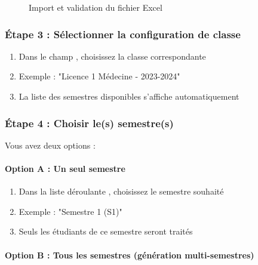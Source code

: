 \begin{figure}[h]
    \centering
    \caption{Import et validation du fichier Excel}
\end{figure}

\subsubsection{Étape 3 : Sélectionner la configuration de classe}

\begin{enumerate}[leftmargin=*]
    \item Dans le champ , choisissez la classe correspondante
    \item Exemple : "Licence 1 Médecine - 2023-2024"
    \item La liste des semestres disponibles s'affiche automatiquement
\end{enumerate}


\subsubsection{Étape 4 : Choisir le(s) semestre(s)}

Vous avez deux options :

\paragraph{Option A : Un seul semestre}

\begin{enumerate}[leftmargin=*]
    \item Dans la liste déroulante , choisissez le semestre souhaité
    \item Exemple : "Semestre 1 (S1)"
    \item Seuls les étudiants de ce semestre seront traités
\end{enumerate}

\paragraph{Option B : Tous les semestres (génération multi-semestres)}

